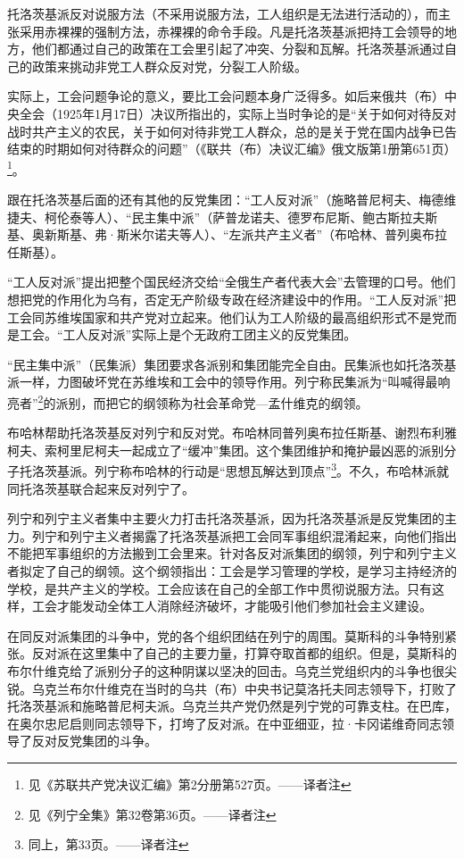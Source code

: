 托洛茨基派反对说服方法（不采用说服方法，工人组织是无法进行活动的），而主张采用赤裸裸的强制方法，赤裸裸的命令手段。凡是托洛茨基派把持工会领导的地方，他们都通过自己的政策在工会里引起了冲突、分裂和瓦解。托洛茨基派通过自己的政策来挑动非党工人群众反对党，分裂工人阶级。

实际上，工会问题争论的意义，要比工会问题本身广泛得多。如后来俄共（布）中央全会（1925年1月17日）决议所指出的，实际上当时争论的是“关于如何对待反对战时共产主义的农民，关于如何对待非党工人群众，总的是关于党在国内战争已告结束的时期如何对待群众的问题”（《联共（布）决议汇编》俄文版第1册第651页）\footnote{见《苏联共产党决议汇编》第2分册第527页。——译者注}。

跟在托洛茨基后面的还有其他的反党集团：“工人反对派”（施略普尼柯夫、梅德维捷夫、柯伦泰等人）、“民主集中派”（萨普龙诺夫、德罗布尼斯、鲍古斯拉夫斯基、奥新斯基、弗·斯米尔诺夫等人）、“左派共产主义者”（布哈林、普列奥布拉任斯基）。

“工人反对派”提出把整个国民经济交给“全俄生产者代表大会”去管理的口号。他们想把党的作用化为乌有，否定无产阶级专政在经济建设中的作用。“工人反对派”把工会同苏维埃国家和共产党对立起来。他们认为工人阶级的最高组织形式不是党而是工会。“工人反对派”实际上是个无政府工团主义的反党集团。

“民主集中派”（民集派）集团要求各派别和集团能完全自由。民集派也如托洛茨基派一样，力图破坏党在苏维埃和工会中的领导作用。列宁称民集派为“叫喊得最响亮者”\footnote{见《列宁全集》第32卷第36页。——译者注}的派别，而把它的纲领称为社会革命党—孟什维克的纲领。

布哈林帮助托洛茨基反对列宁和反对党。布哈林同普列奥布拉任斯基、谢烈布利雅柯夫、索柯里尼柯夫一起成立了“缓冲”集团。这个集团维护和掩护最凶恶的派别分子托洛茨基派。列宁称布哈林的行动是“思想瓦解达到顶点”\footnote{同上，第33页。——译者注}。不久，布哈林派就同托洛茨基联合起来反对列宁了。

列宁和列宁主义者集中主要火力打击托洛茨基派，因为托洛茨基派是反党集团的主力。列宁和列宁主义者揭露了托洛茨基派把工会同军事组织混淆起来，向他们指出不能把军事组织的方法搬到工会里来。针对各反对派集团的纲领，列宁和列宁主义者拟定了自己的纲领。这个纲领指出：工会是学习管理的学校，是学习主持经济的学校，是共产主义的学校。工会应该在自己的全部工作中贯彻说服方法。只有这样，工会才能发动全体工人消除经济破坏，才能吸引他们参加社会主义建设。

在同反对派集团的斗争中，党的各个组织团结在列宁的周围。莫斯科的斗争特别紧张。反对派在这里集中了自己的主要力量，打算夺取首都的组织。但是，莫斯科的布尔什维克给了派别分子的这种阴谋以坚决的回击。乌克兰党组织内的斗争也很尖锐。乌克兰布尔什维克在当时的乌共（布）中央书记莫洛托夫同志领导下，打败了托洛茨基派和施略普尼柯夫派。乌克兰共产党仍然是列宁党的可靠支柱。在巴库，在奥尔忠尼启则同志领导下，打垮了反对派。在中亚细亚，拉·卡冈诺维奇同志领导了反对反党集团的斗争。

